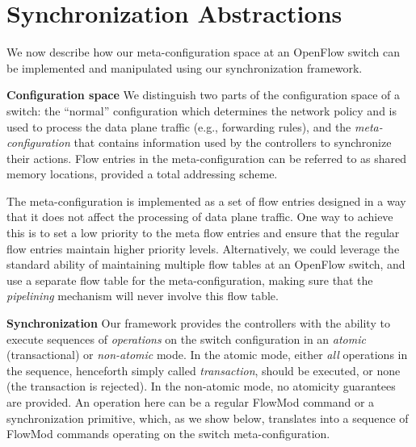 \documentclass[conference]{sigcomm-alternate}
\newcommand{\petr}[1]{\textit{\textcolor{blue}{[petr]: #1}}} %
\begin{document}

\section{Synchronization Abstractions}\label{sec:main}

We now describe how our  meta-configuration space at
an OpenFlow switch can be implemented and manipulated using our
synchronization framework.

\noindent\textbf{Configuration space}
%
We distinguish two parts of the configuration space of a switch:
the ``normal'' configuration which determines the network policy and
is used to process the data plane traffic (e.g., forwarding rules),
and the \emph{meta-configuration} that contains information used by the
controllers to synchronize their actions.
Flow entries in the meta-configuration can be referred to as shared
memory locations, provided a total addressing scheme.

The meta-configuration is implemented as a set of flow entries
designed in a way that it does not affect the processing of data plane
traffic. One way to achieve this is to set a low priority to
the meta flow entries and ensure that the regular flow entries
maintain higher priority levels.
Alternatively, we could leverage the standard ability of maintaining multiple
flow tables at an OpenFlow switch, and use a separate flow table for
the meta-configuration,  making sure that the
\emph{pipelining} mechanism will never involve this
flow table.




\noindent\textbf{Synchronization}
Our framework provides the controllers with the ability to execute
sequences of \emph{operations} on the
switch configuration in an \emph{atomic} (transactional) or \emph{non-atomic} mode.
In the atomic mode, either \emph{all} operations in the sequence, henceforth simply
called \emph{transaction},
should be executed, or none (the transaction is rejected).
In the non-atomic mode, no atomicity guarantees are provided.
An operation here can be a regular FlowMod command or a synchronization
primitive, which, as we
show below, translates into a sequence of FlowMod commands operating on the
switch meta-configuration.
\end{document}
